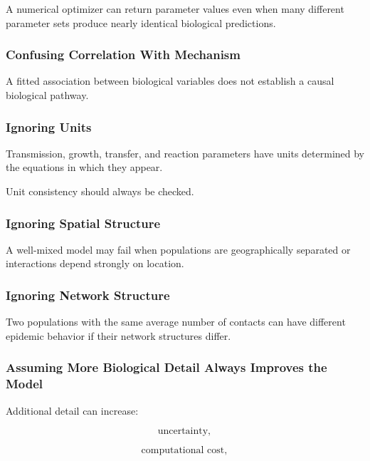 A numerical optimizer can return parameter values even when many different
parameter sets produce nearly identical biological predictions.

\subsubsection{Confusing Correlation With Mechanism}

A fitted association between biological variables does not establish a
causal biological pathway.

\subsubsection{Ignoring Units}

Transmission, growth, transfer, and reaction parameters have units determined
by the equations in which they appear.

Unit consistency should always be checked.

\subsubsection{Ignoring Spatial Structure}

A well-mixed model may fail when populations are geographically separated or
interactions depend strongly on location.

\subsubsection{Ignoring Network Structure}

Two populations with the same average number of contacts can have different
epidemic behavior if their network structures differ.

\subsubsection{Assuming More Biological Detail Always Improves the Model}

Additional detail can increase:

\[
\boxed{
\text{uncertainty},
}
\]

\[
\boxed{
\text{computational cost},
}
\]

